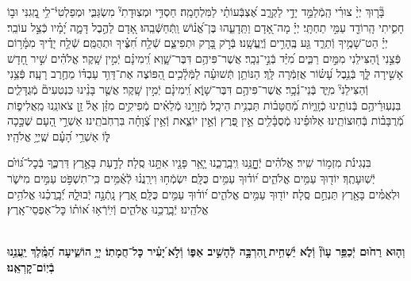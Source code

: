 \documentclass[twoside, openany, parskip=half, 11pt]{book}
\begin{document}
בָּ֘ר֤וּךְ יְיָ֨ צוּרִ֗י הַֽמְֿלַמֵּ֣ד יָדַ֣י לַקְרָ֑ב אֶ֝צְבְּֿעוֹתַ֗י לַמִּלְחָמָֽה׃
חַסְדִּ֥י וּמְצֽוּדָתִי֘ מִשְׂגַּבִּ֢י וּמְפַלְטִי֫־לִ֥י מָֽ֭גִנִּי וּב֣וֹ חָסִ֑יתִי הָֽרוֹדֵ֖ד עַמִּ֣י תַחְתָּֽי׃
יְיָ֗ מָה־אָ֭דָם וַתֵּֽדָעֵ֑הוּ בֶּן־אֱ֝נ֗וֹשׁ וַֽתְּֿחַשְּֿׁבֵֽהוּ׃
אָ֭דָם לַהֶ֣בֶל דָּמָ֑ה יָ֝מָ֗יו כְּֿצֵ֣ל עוֹבֵֽר׃
יְיָ֗ הַט־שָׁמֶ֥יךָ וְֿתֵרֵ֑ד גַּ֖ע בֶּֽהָרִ֣ים וְֿיֶֽעֱשָֽׁנוּ׃
בְּֿרֹ֣ק בָּ֭רָק וּתְפִיצֵ֑ם שְֿׁלַ֥ח חִ֝צֶּ֗יךָ וּתְהֻמֵּֽם׃
שְֿׁלַ֥ח יָדֶ֗יךָ מִמָּ֫ר֥וֹם פְּֿצֵ֣נִי וְֿ֭הַצִּילֵנִי מִמַּ֣יִם רַבִּ֑ים מִ֝יַּ֗ד בְּֿנֵ֣י־נֵכָֽר׃
אֲשֶׁר־פִּיהֶ֥ם דִּבֶּר־שָׁ֑וְא וִֽ֝ימִינָ֗ם יְֿמִ֣ין שָֽׁקֶר׃
אֱלֹהִ֗ים שִׁ֣יר חָ֭דָשׁ אָשִׁ֣ירָה לָּ֑ךְ בְּֿנֵ֥בֶל עָ֝שׂ֗וֹר אֲזַמְּֿרָה לָּֽךְ׃
הַנּוֹתֵ֥ן תְּֿשׁוּעָ֗ה לַמְּֿלָ֫כִ֥ים הַ֭פּוֹצֶה אֶת־דָּוִ֥ד עַבְדּ֗וֹ מֵחֶ֥רֶב רָעָֽה׃
פְּֿצֵ֥נִי וְֿהַצִּילֵנִי֘ מִיַּ֢ד בְּֽֿנֵי־נֵ֫כָ֥ר׃
אֲשֶׁר־פִּיהֶ֥ם דִּבֶּר־שָׁוְֿ֑א וִֽ֝ימִינָ֗ם יְֿמִ֣ין שָֽׁקֶר׃
אֲשֶׁ֤ר בָּנֵ֨ינוּ כִּנְטִעִים֘ מְֿגֻדָּלִ֢ים בִּנְעֽוּרֵ֫יהֶ֥ם בְּֿנוֹתֵ֥ינוּ כְֿזָֽוִ֑יּוֹת מְֿ֝חֻטָּב֗וֹת תַּבְנִ֥ית הֵיכָֽל׃
מְֿזָוֵי֣נוּ מְֿלֵאִ֗ים מְֿפִיקִ֥ים מִזַּ֗ן אֶל֫ זַ֥ן צֹאונֵֽנוּ מַֽאֲלִיפ֑וֹת מְֿ֝רֻבָּב֗וֹת בְּֿחֽוּצוֹתֵֽינוּ׃
אַלּוּפֵ֗ינוּ מְֽֿסֻבָּ֫לִ֥ים אֵ֣ין פֶּ֭רֶץ וְֿאֵ֣ין יוֹצֵ֑את וְֿאֵ֥ין צְֿ֝וָחָ֗ה בִּרְחֹֽבֹתֵֽינוּ׃
אַשְׁרֵ֣י הָ֭עָם שֶׁכָּ֣כָה לּ֑וֹ אַשְׁרֵ֥י הָ֝עָ֗ם שֶֽׁיְיָ֥ אֱלֹהָֽיו׃



בִּנְגִינֹ֗ת מִזְמ֥וֹר שִֽׁיר׃
אֱלֹהִ֗ים יְֿחׇׇׇׇָנֵּ֥נוּ וִֽיבָֽרֲכֵ֑נוּ יָ֤אֵ֥ר פָּנָ֖יו אִתָּ֣נוּ סֶֽלָה׃
לָדַ֣עַת בָּאָ֣רֶץ דַּרְכֶּ֑ךָ בְּֿכׇל־גּ֝וֹיִ֗ם יְֿשֽׁוּעָתֶֽךָ׃
יוֹד֖וּךָ עַמִּ֥ים אֱלֹהִ֑ים י֝וֹד֗וּךָ עַמִּ֥ים כֻּלָּֽם׃
יִשְׂמְֿח֥וּ וִירַֽנֲנ֗וּ לְֿאֻ֫מִּ֥ים כִּֽי־תִשְׁפֹּ֣ט עַמִּ֣ים מִישֹׁ֑ר
וּלְאֻמִּ֓ים בָּאָ֖רֶץ תַּנְחֵ֣ם סֶֽלָה׃
יוֹד֖וּךָ עַמִּ֥ים אֱלֹהִ֑ים י֝וֹד֗וּךָ עַמִּ֥ים כֻּלָּֽם׃
אֶ֭רֶץ נָֽתְֿנָ֣ה יְֿבוּלָ֑הּ יְֿ֝בָֽרֲכֵ֗נוּ אֱלֹהִ֥ים אֱלֹהֵֽינוּ׃
יְֿבָֽרֲכֵ֥נוּ אֱלֹהִ֑ים וְֿיִֽיֿרְֿא֥וּ א֝וֹת֗וֹ כׇּל־אַפְסֵי־אָֽרֶץ׃

\\
\textbf{וְה֤וּא רַח֙וּם יְֿכַפֵּ֥ר עָוֹן֘ וְֿלֹ֢א יַ֫שְׁחִ֥ית ֖וְהִרְבָּ֣ה לְֿהָשִׁ֣יב אַפּ֑וֹ וְֿלֹ֣א ֝יָעִ֗יר כׇּל־חֲמָתֽוֹ׃ יְיָ֥ הוֹשִׁ֑יעָה הַ֝מֶּֽ֗לֶךְ יַֽעֲנֵ֥נוּ בְֿיֽוֹם־קׇרְאֵֽנוּ׃}

\clearpage

\barachu

\hamaarivaravim

\ahavasolam

\shema

\veahavta

\vehaya

\vayomer{}
\end{document}
